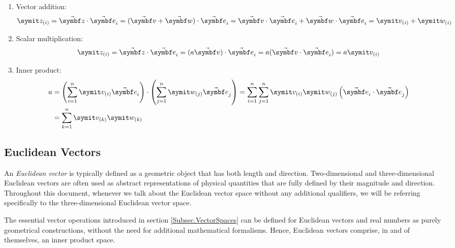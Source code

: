\begin{enumerate}
\item Vector addition:%
\begin{equation} \label{Eq.Def.AdditionComp}
\cmp{z}{i}=\vabs{z}\cdot\vasub{\bv}{i}=(\vabs{v}+\vabs{w}) \cdot \vasub{\bv}{i} = \vabs{v} \cdot \vasub{\bv}{i} + \vabs{w} \cdot \vasub{\bv}{i} = \cmp{v}{i}+\cmp{w}{i}
\end{equation}

\item Scalar multiplication:%
\begin{equation} \label{Eq.Def.MultComp}
\cmp{z}{i}=\vabs{z} \cdot \vasub{\bv}{i} = (a\vabs{v}) \cdot \vasub{\bv}{i} = a(\vabs{v} \cdot \vasub{\bv}{i}) = a\cmp{v}{i}
\end{equation}

\item Inner product:%
\begin{equation} \label{Eq.Def.ScalarProdComp}
\begin{split}
a &= \rndp{\sum_{i=1}^{n}\cmp{v}{i}\vasub{\bv}{i}} \cdot \rndp{\sum_{j=1}^{n}\cmp{w}{j}\vasub{\bv}{j}} = \sum_{i=1}^{n} \sum_{j=1}^{n} \cmp{v}{i} \cmp{w}{j} \rndp{\vasub{\bv}{i} \cdot \vasub{\bv}{j} } \\
&=  \sum_{k=1}^{n}\cmp{v}{k}\cmp{w}{k}
\end{split}
\end{equation}

\end{enumerate}

\subsection{Euclidean Vectors}
An \emph{Euclidean vector} is typically defined as a geometric object that has both length and direction. Two-dimensional and three-dimensional Euclidean vectors are often used as abstract representations of physical quantities that are fully defined by their magnitude and direction. Throughout this document, whenever we talk about the Euclidean vector space without any additional qualifiers, we will be referring specifically to the three-dimensional Euclidean vector space.%

The essential vector operations introduced in section \ref{Subsec.VectorSpaces} can be defined for Euclidean vectors and real numbers as purely geometrical constructions, without the need for additional mathematical formalisms. Hence, Euclidean vectors comprise, in and of themselves, an inner product space.

